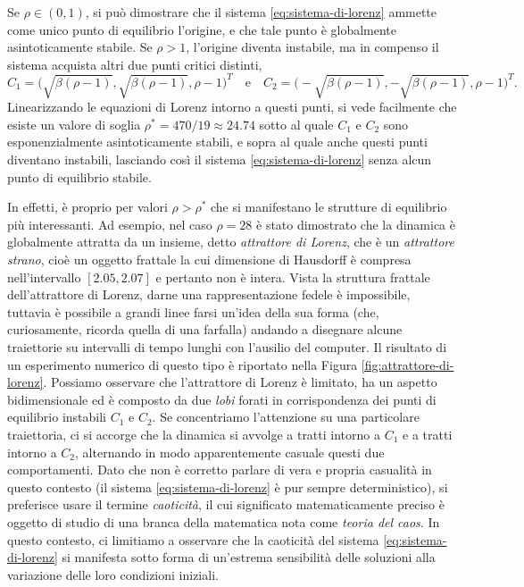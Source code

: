 Se $\rho \in (0,1)$, si può dimostrare che il sistema \eqref{eq:sistema-di-lorenz}
ammette come unico punto di equilibrio l'origine, e che tale punto
è globalmente asintoticamente stabile.
Se $\rho > 1$, l'origine diventa instabile, ma in compenso il sistema
acquista altri due punti critici distinti,
\[
C_1 = \bigl( \sqrt{\beta(\rho-1)}, \sqrt{\beta(\rho-1)}, \rho-1 \bigr)^T
\quad \text{e} \quad
C_2 = \bigl(-\sqrt{\beta(\rho-1)},-\sqrt{\beta(\rho-1)}, \rho-1 \bigr)^T.
\]
Linearizzando le equazioni di Lorenz intorno a questi punti, si vede facilmente
che esiste un valore di soglia $\rho^* = 470/19 \approx 24.74$ sotto
al quale $C_1$ e $C_2$ sono esponenzialmente asintoticamente stabili,
e sopra al quale anche questi punti diventano instabili, lasciando così
il sistema \eqref{eq:sistema-di-lorenz} senza alcun punto di equilibrio stabile.

In effetti, è proprio per valori $\rho > \rho^*$ che si manifestano le strutture
di equilibrio più interessanti. Ad esempio, nel caso $\rho = 28$ è stato
dimostrato che la dinamica è globalmente attratta da un insieme,
detto \emph{attrattore di Lorenz}, che è un \emph{attrattore strano},
cioè un oggetto frattale la cui dimensione di Hausdorff è compresa
nell'intervallo $[2.05,2.07]$ e pertanto non è intera.
Vista la struttura frattale dell'attrattore di Lorenz, darne una rappresentazione
fedele è impossibile, tuttavia è possibile a grandi linee farsi un'idea
della sua forma (che, curiosamente, ricorda quella di una farfalla) andando
a disegnare alcune traiettorie su intervalli di tempo lunghi con
l'ausilio del computer. Il risultato di un esperimento numerico di questo tipo
è riportato nella Figura \ref{fig:attrattore-di-lorenz}.
Possiamo osservare che l'attrattore di Lorenz è limitato, ha un aspetto
bidimensionale ed è composto da due \emph{lobi} forati in corrispondenza dei
punti di equilibrio instabili $C_1$ e $C_2$.
Se concentriamo l'attenzione su una particolare traiettoria, ci si accorge
che la dinamica si avvolge a tratti intorno a $C_1$ e a tratti intorno a $C_2$,
alternando in modo apparentemente casuale questi due comportamenti.
Dato che non è corretto parlare di vera e propria casualità in questo
contesto (il sistema \eqref{eq:sistema-di-lorenz} è pur sempre deterministico),
si preferisce usare il termine \emph{caoticità}, il cui significato matematicamente
preciso è oggetto di studio di una branca della matematica nota come \emph{teoria del caos}.
In questo contesto, ci limitiamo a osservare che la caoticità del sistema
\eqref{eq:sistema-di-lorenz} si manifesta sotto forma di un'estrema sensibilità
delle soluzioni alla variazione delle loro condizioni iniziali.

